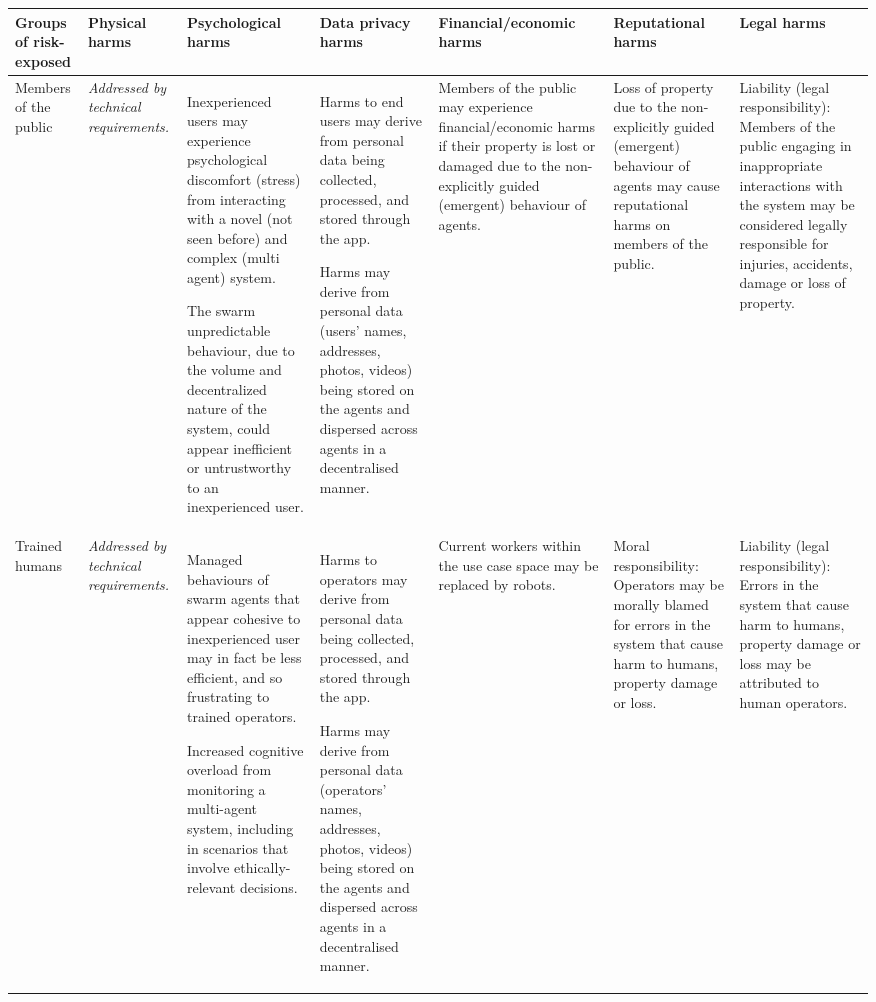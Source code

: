 \documentclass[lettersize,journal]{IEEEtran}
\begin{document}
\begin{landscape}
\begin{table}[]
\begin{tabular}{|p{0.10\textheight}|p{0.07\textheight}|p{0.20\textheight}|p{0.20\textheight}|p{0.20\textheight}|p{0.20\textheight}|p{0.20\textheight}|}
\hline
\textbf{Groups of risk-exposed} & \textbf{Physical harms} & \textbf{Psychological harms} & \textbf{Data privacy harms}  & \textbf{Financial/economic harms}   & \textbf{Reputational harms}  & \textbf{Legal harms} \\ \hline

Members of the public  & \textit{Addressed by technical requirements.} & Inexperienced users may experience psychological discomfort (stress) from interacting with a novel (not seen before) and complex (multi agent) system. 

The swarm unpredictable behaviour, due to the volume and decentralized nature of the system, could appear inefficient or untrustworthy to an inexperienced user. & Harms to end users may derive from personal data being collected, processed, and stored through the app. 

Harms may derive from personal data (users’ names, addresses, photos, videos) being stored on the agents and dispersed across agents in a decentralised manner. & Members of the public may experience financial/economic harms if their property is lost or damaged due to the non-explicitly guided (emergent) behaviour of agents. & Loss of property due to the non-explicitly guided (emergent) behaviour of agents may cause reputational harms on members of the public. & Liability (legal responsibility): Members of the public engaging in inappropriate interactions with the system may be considered legally responsible for injuries, accidents, damage or loss of property. \\ \hline

Trained humans  & \textit{Addressed by technical requirements.} & Managed behaviours of swarm agents that appear cohesive to inexperienced user may in fact be less efficient, and so frustrating to trained operators.

Increased cognitive overload from monitoring a multi-agent system, including in scenarios that involve ethically-relevant decisions. & Harms to operators may derive from personal data being collected, processed, and stored through the app.

Harms may derive from personal data (operators’ names, addresses, photos, videos) being stored on the agents and dispersed across agents in a decentralised manner. & Current workers within the use case space may be replaced by robots. & Moral responsibility: Operators may be morally blamed for errors in the system that cause harm to humans, property damage or loss. & Liability (legal responsibility): Errors in the system that cause harm to humans, property damage or loss may be attributed to human operators. \\ \hline


\end{tabular}
\end{table}
\end{landscape}
\end{document}
